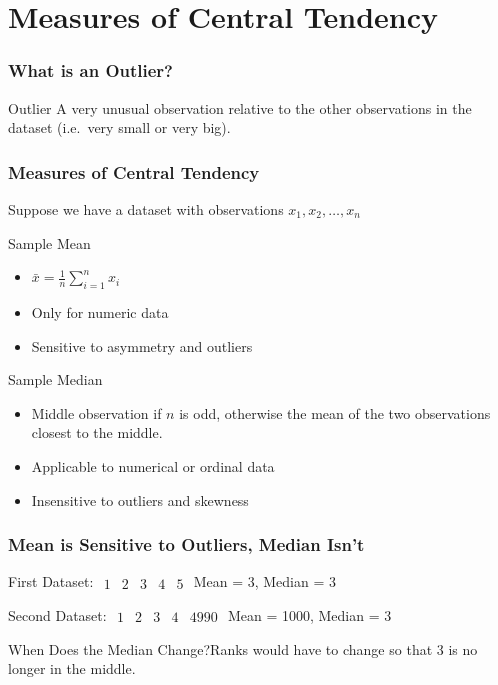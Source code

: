 \section{Measures of Central Tendency}

\begin{frame}
\frametitle{What is an Outlier?}
	\begin{block}{Outlier}
	A very unusual observation relative to the other observations in the dataset (i.e.\ very small or very big).
\end{block}
\end{frame}


\begin{frame}
\frametitle{Measures of Central Tendency}
Suppose we have a dataset with observations $x_1, x_2, \hdots, x_n$
	\begin{block}{Sample Mean}
		\begin{itemize}
			\item $\displaystyle\bar{x} = \frac{1}{n} \sum_{i=1}^n x_i$
			\item Only for numeric data
			\item Sensitive to asymmetry and outliers
		\end{itemize}
	\end{block}\pause
	\begin{block}{Sample Median}
		\begin{itemize}
		\item Middle observation if $n$ is odd, otherwise the mean of the two observations closest to the middle.
		\item Applicable to numerical or ordinal data
		\item Insensitive to outliers and skewness
		\end{itemize}
	\end{block}
\end{frame}
\begin{frame}
\frametitle{Mean is Sensitive to Outliers, Median Isn't}

\begin{block}{First Dataset: $\begin{array}{ccccc}1& 2& 3& 4& 5\end{array}$}
Mean = 3, Median = 3
\end{block}
\pause

\begin{block}{Second Dataset: $\begin{array}{ccccc}1& 2& 3& 4& 4990\end{array}$}
Mean = 1000, Median = 3
\end{block}
\pause
\begin{alertblock}{When Does the Median Change?}Ranks would have to change so that 3 is no longer in the middle.\end{alertblock}

\end{frame}
